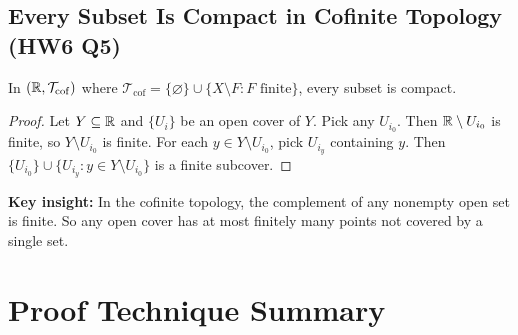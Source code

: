 \documentclass{article}
\begin{document}
\subsection{Every Subset Is Compact in Cofinite Topology (HW6 Q5)}
\begin{theorem}
  In $(\mathbb{R}, \mathcal{T}_{\mathrm{cof}})$ where
  $\mathcal{T}_{\mathrm{cof}} = \{\varnothing\} \cup \{X \setminus F
  : F \text{ finite}\}$, every subset is compact.
\end{theorem}
\begin{proof}
  Let $Y \subseteq \mathbb{R}$ and $\{U_i\}$ be an open cover of $Y$. Pick
  any $U_{i_0}$. Then $\mathbb{R} \setminus U_{i_0}$ is finite, so $Y
  \setminus U_{i_0}$ is finite. For each $y \in Y \setminus U_{i_0}$,
  pick $U_{i_y}$ containing $y$. Then $\{U_{i_0}\} \cup \{U_{i_y} : y
  \in Y \setminus U_{i_0}\}$ is a finite subcover.
\end{proof}
\textbf{Key insight:} In the cofinite topology, the complement of any
nonempty open set is finite. So any open cover has at most finitely
many points not covered by a single set.

\section{Proof Technique Summary}
\end{document}
